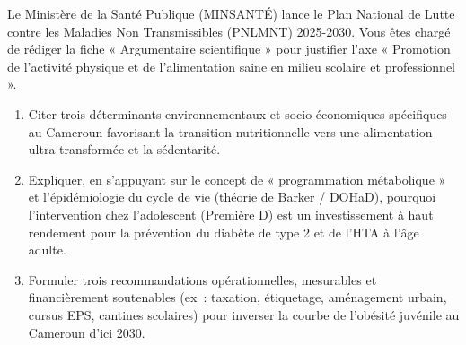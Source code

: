 \documentclass[11pt]{article}
\begin{document}
\begin{exercice}
Le Ministère de la Santé Publique (MINSANTÉ) lance le Plan National de Lutte contre les Maladies Non Transmissibles (PNLMNT) 2025-2030. Vous êtes chargé de rédiger la fiche « Argumentaire scientifique » pour justifier l'axe « Promotion de l'activité physique et de l'alimentation saine en milieu scolaire et professionnel ».
\begin{enumerate}
    \item Citer trois déterminants environnementaux et socio-économiques spécifiques au Cameroun favorisant la transition nutritionnelle vers une alimentation ultra-transformée et la sédentarité.
    \item Expliquer, en s'appuyant sur le concept de « programmation métabolique » et l'épidémiologie du cycle de vie (théorie de Barker / DOHaD), pourquoi l'intervention chez l'adolescent (Première D) est un investissement à haut rendement pour la prévention du diabète de type 2 et de l'HTA à l'âge adulte.
    \item Formuler trois recommandations opérationnelles, mesurables et financièrement soutenables (ex~: taxation, étiquetage, aménagement urbain, cursus EPS, cantines scolaires) pour inverser la courbe de l'obésité juvénile au Cameroun d'ici 2030.
\end{enumerate}
\end{exercice}
\end{document}
